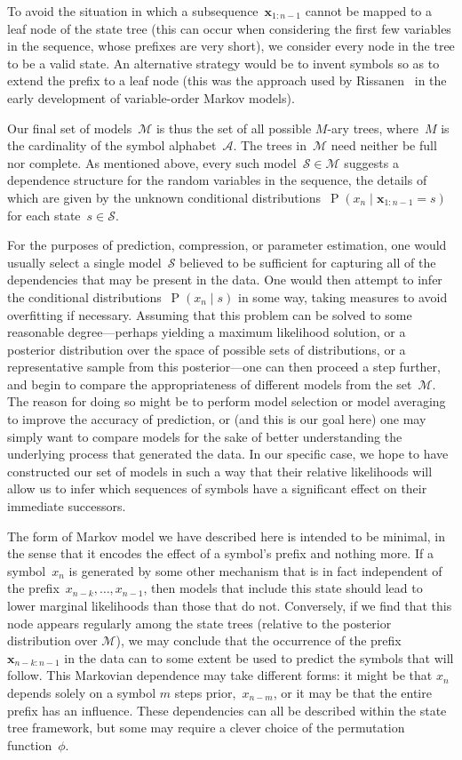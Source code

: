 \documentclass[11pt,a4paper]{article}
\newcommand\mc[1]{\mathcal{#1}}               %
\newcommand\ub[1]{\symbf{#1}}                 %
\DeclareMathOperator\Pb{P}                    %
\begin{document}
To avoid the situation in which a subsequence~\(\ub{x}_{1:n-1}\) cannot be
mapped to a leaf node of the state tree (this can occur when considering the
first few variables in the sequence, whose prefixes are very short), we consider
every node in the tree to be a valid state. An alternative strategy would be to
invent symbols so as to extend the prefix to a leaf node (this was the approach
used by Rissanen~\cite{rissanen1986complexity} in the early development of
variable-order Markov models).

Our final set of models~\(\mc{M}\) is thus the set of all possible \(M\)-ary
trees, where~\(M\) is the cardinality of the symbol alphabet~\(\mc{A}\). The
trees in~\(\mc{M}\) need neither be full nor complete. As mentioned above, every
such model~\(\mc{S} \in \mc{M}\) suggests a dependence structure for the random
variables in the sequence, the details of which are given by the unknown
conditional distributions~\(\Pb(x_n \mid \ub{x}_{1:n-1} = s)\) for each
state~\(s \in \mc{S}\).

For the purposes of prediction, compression, or parameter estimation, one would
usually select a single model~\(\mc{S}\) believed to be sufficient for
capturing all of the dependencies that may be present in the data. One would
then attempt to infer the conditional distributions~\(\Pb(x_n \mid s)\) in some
way, taking measures to avoid overfitting if necessary. Assuming that this
problem can be solved to some reasonable degree---perhaps yielding a maximum
likelihood solution, or a posterior distribution over the space of possible sets
of distributions, or a representative sample from this posterior---one can then
proceed a step further, and begin to compare the appropriateness of different
models from the set~\(\mc{M}\). The reason for doing so might be to perform
model selection or model averaging to improve the accuracy of prediction, or
(and this is our goal here) one may simply want to compare models for the sake
of better understanding the underlying process that generated the data. In our
specific case, we hope to have constructed our set of models in such a way that
their relative likelihoods will allow us to infer which sequences of symbols
have a significant effect on their immediate successors.

The form of Markov model we have described here is intended to be minimal, in
the sense that it encodes the effect of a symbol's prefix and nothing more. If a
symbol~\(x_n\) is generated by some other mechanism that is in fact independent
of the prefix~\(x_{n-k}, \dots, x_{n-1}\), then models that include this state
should lead to lower marginal likelihoods than those that do not. Conversely, if
we find that this node appears regularly among the state trees (relative to the
posterior distribution over \(\mc{M}\)), we may conclude that the occurrence of
the prefix~\(\ub{x}_{n-k:n-1}\) in the data can to some extent be used to
predict the symbols that will follow. This Markovian dependence may take
different forms: it might be that \(x_n\) depends solely on a symbol \(m\) steps
prior,~\(x_{n-m}\), or it may be that the entire prefix has an influence. These
dependencies can all be described within the state tree framework, but some may
require a clever choice of the permutation function~\(\phi\).
\end{document}
